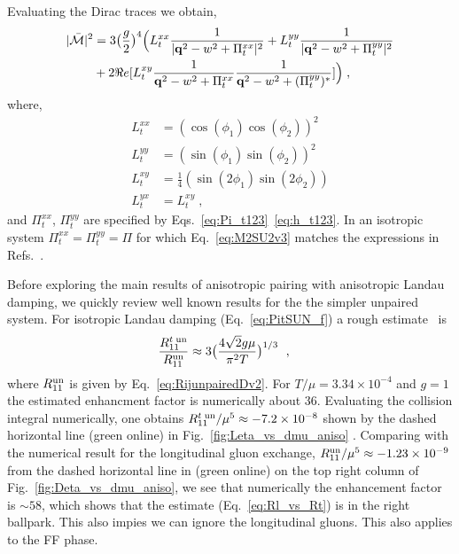 \documentclass[10pt, aps, prd, superscriptaddress, nofootinbib, 
               amsmath, amssymb, twocolumn,
               preprintnumbers, showpacs,
               raggedbottom,
               floatfix]{revtex4-1}
\newcommand{\calM}{{\cal{M}}}
\newcommand{\bfq}{{\bf{q}}}
\newcommand{\un}{{\rm{un}}}
\begin{document}
Evaluating the Dirac traces we obtain, 
\begin{equation}
\begin{split}
|\bar{\calM}|^2 &= 3 \bigl(\frac{g}{2}\bigr)^4  \Bigl( 
    L_t^{xx}\frac{1}{|\bfq^2-w^2+\Pi^{xx}_t|^2}
  + L_t^{yy}\frac{1}{|\bfq^2-w^2+\Pi^{yy}_t|^2}\\
  &
  + 2\Re e[L_t^{xy}\frac{1}{\bfq^2-w^2+\Pi^{xx}_t}\frac{1}{\bfq^2-w^2+(\Pi^{yy}_t)^*}] 
    \Bigr)\;,~\label{eq:M2SU2v3}
\end{split}
\end{equation}
where,
\begin{equation}
\begin{split}
L_t^{xx} &= ( \cos(\phi_1)\cos(\phi_2) )^2\\
L_t^{yy} &= ( \sin(\phi_1)\sin(\phi_2) )^2\\
L_t^{xy} &= \frac{1}{4}( \sin(2\phi_1)\sin(2\phi_2) )\\
L_t^{yx} &= L_t^{xy}\;,~\label{eq:M2SU2v4}
\end{split}
\end{equation}
and $\Pi^{xx}_t$, $\Pi^{yy}_t$ are specified by 
Eqs.~\ref{eq:Pi_t123}~\ref{eq:h_t123}.  In an isotropic system 
$\Pi^{xx}_t=\Pi^{yy}_t=\Pi$ for which Eq.~\ref{eq:M2SU2v3} matches the
expressions in Refs.~\cite{Heiselberg:1993,Alford:2014doa}.

Before exploring the main results of anisotropic pairing with anisotropic
Landau damping, we quickly review well known results for the the simpler
unpaired system. For isotropic Landau damping (Eq.~\ref{eq:PitSUN_f}) a rough
estimate~\cite{Heiselberg:1993,Alford:2014doa} is 
\begin{equation}
\begin{split}
\frac{R_{11}^{t\;\un}}{R_{11}^{\un}} 
&\approx  3\bigl(\frac{4\sqrt{2}g\mu}{\pi^2 T}\bigr)^{1/3}~\label{eq:Rl_vs_Rt}\;,
\end{split}
\end{equation}
where $R_{11}^{\un}$ is given by Eq.~\ref{eq:RijunpairedDv2}.  For
$T/\mu=3.34\times10^{-4}$ and $g=1$ the estimated enhancment factor is
numerically about $36$. Evaluating the collision integral numerically,
one obtains $R_{11}^{t\;\un}/\mu^5\approx-7.2\times10^{-8}$ shown by the 
dashed horizontal line (green online) in Fig.~\ref{fig:Leta_vs_dmu_aniso} .  Comparing with the numerical
result for the longitudinal gluon exchange, $R_{11}^{\un}/\mu^5\approx
-1.23\times10^{-9}$ from the dashed horizontal line in (green online) on 
the top right column of Fig.~\ref{fig:Deta_vs_dmu_aniso}, we see that numerically the
enhancement factor is $\sim58$, which shows that the estimate
(Eq.~\ref{eq:Rl_vs_Rt}) is in the right ballpark. This also impies we can
ignore the longitudinal gluons. This also applies to the FF phase.
\end{document}
